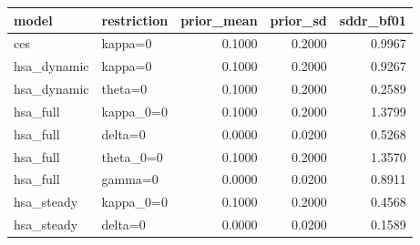 \begin{tabular}{llrrr}
\toprule
model & restriction & prior\_mean & prior\_sd & sddr\_bf01 \\
\midrule
ces & kappa=0 & 0.1000 & 0.2000 & 0.9967 \\
hsa\_dynamic & kappa=0 & 0.1000 & 0.2000 & 0.9267 \\
hsa\_dynamic & theta=0 & 0.1000 & 0.2000 & 0.2589 \\
hsa\_full & kappa\_0=0 & 0.1000 & 0.2000 & 1.3799 \\
hsa\_full & delta=0 & 0.0000 & 0.0200 & 0.5268 \\
hsa\_full & theta\_0=0 & 0.1000 & 0.2000 & 1.3570 \\
hsa\_full & gamma=0 & 0.0000 & 0.0200 & 0.8911 \\
hsa\_steady & kappa\_0=0 & 0.1000 & 0.2000 & 0.4568 \\
hsa\_steady & delta=0 & 0.0000 & 0.0200 & 0.1589 \\
\bottomrule
\end{tabular}
